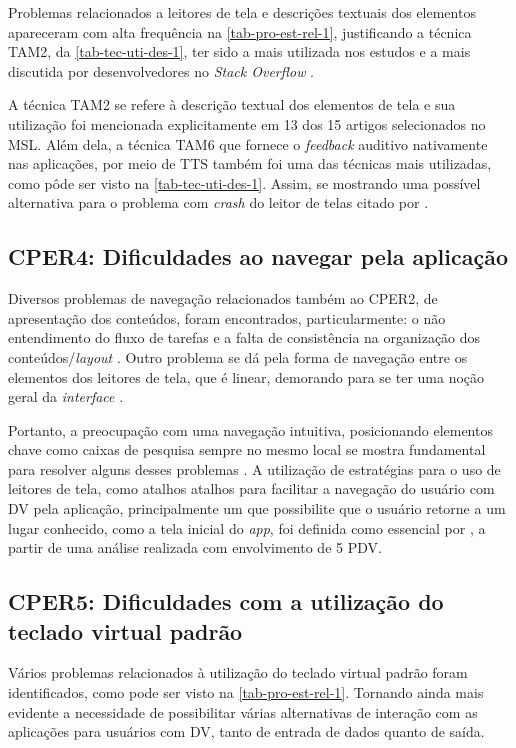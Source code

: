 Problemas relacionados a leitores de tela e descrições textuais dos elementos apareceram com alta frequência na \autoref{tab-pro-est-rel-1},
justificando a técnica TAM2, da \autoref{tab-tec-uti-des-1}, ter sido a mais utilizada nos estudos e a mais discutida por
desenvolvedores no \emph{Stack Overflow} \cite{Vendome201941}.

A técnica TAM2 se refere à descrição textual dos elementos de tela e sua utilização foi mencionada explicitamente em 13 dos
15 artigos selecionados no MSL\@. Além dela, a técnica TAM6 que fornece o \emph{feedback} auditivo nativamente nas aplicações,
por meio de TTS também foi uma das técnicas mais utilizadas, como pôde ser visto na \autoref{tab-tec-uti-des-1}. Assim, se mostrando
uma possível alternativa para o problema com \emph{crash} do leitor de telas citado por .

\subsection{CPER4: Dificuldades ao navegar pela aplicação}

Diversos problemas de navegação relacionados também ao CPER2, de apresentação dos conteúdos, foram encontrados, particularmente:
o não entendimento do fluxo de tarefas e a falta de consistência na organização dos conteúdos/\emph{layout}
\cite{Shera2021285,Christoph2020,Quispe2020}. Outro problema se dá pela forma de navegação entre os elementos dos leitores de tela,
que é linear, demorando para se ter uma noção geral da \emph{interface} \cite{Damaceno2016}.

Portanto, a preocupação com uma navegação intuitiva, posicionando elementos chave como caixas de pesquisa sempre no mesmo
local se mostra fundamental para resolver alguns desses problemas \cite{Kim20191103,Mascetti2019,Ducci2018}.
A utilização de estratégias para o uso de leitores de tela, como atalhos atalhos para facilitar a navegação do usuário com DV
pela aplicação, principalmente um que possibilite que o usuário retorne a um lugar conhecido, como a tela inicial do \emph{app},
foi definida como essencial por , a partir de uma análise realizada com envolvimento de 5 PDV\@.

\subsection{CPER5: Dificuldades com a utilização do teclado virtual padrão}

Vários problemas relacionados à utilização do teclado virtual padrão foram identificados, como pode ser visto na
\autoref{tab-pro-est-rel-1}. Tornando ainda mais evidente a necessidade de possibilitar várias alternativas de interação
com as aplicações para usuários com DV\@, tanto de entrada de dados quanto de saída.

